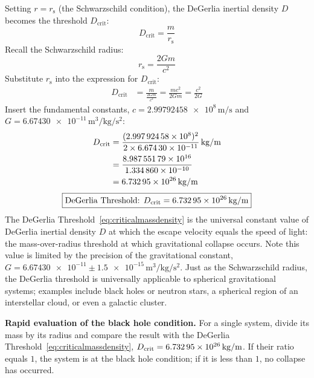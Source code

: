 \documentclass[twoside,twocolumn,9pt,fleqn]{article}
\begin{document}
Setting $r = r_{\mathrm{s}}$ (the Schwarzschild condition), the DeGerlia inertial density $D$ becomes the threshold $D_{\mathrm{crit}}$:
\begin{equation}
D_{\mathrm{crit}} = \frac{m}{r_{\mathrm{s}}}
\label{eq:dcritdef}
\end{equation}
Recall the Schwarzschild radius\cite{schwarzschild1916radius}:
\begin{equation}
r_{\mathrm{s}} = \frac{2Gm}{c^2}
\label{eq:schwarzschildradius}
\end{equation}
Substitute $r_{\mathrm{s}}$ into the expression for $D_{\mathrm{crit}}$:
\begin{align}
D_{\mathrm{crit}} &= \frac{m}{\frac{2Gm}{c^2}} = \frac{m c^2}{2Gm} = \frac{c^2}{2G}
\end{align}
Insert the fundamental constants\cite{crc2019}, $c = \num{2.99792458e8}\,\unit{\meter\per\second}$ and $G = \num{6.67430e-11}\,\unit{\meter\cubed\per\kilogram\per\second\squared}$:
\begin{align*}
D_{\mathrm{crit}} &= \frac{(\num{2.99792458e8})^2}{2 \times \num{6.67430e-11}}\,\unit[per-mode=symbol]{\kilogram\per\meter} \\
         &= \frac{\num{8.98755179e16}}{\num{1.334860e-10}} \\
         &= \num{6.73295e26}\,\unit[per-mode=symbol]{\kilogram\per\meter}
\end{align*}
\begin{equation}
\boxed{ \text{DeGerlia Threshold: } D_{\mathrm{crit}} = \num{6.73295e26}\,\unit[per-mode=symbol]{\kilogram\per\meter} }
\label{eq:criticalmassdensity}
\end{equation}
The DeGerlia Threshold~\eqref{eq:criticalmassdensity} is the universal constant value of DeGerlia inertial density $D$ at which the escape velocity equals the speed of light: the mass-over-radius threshold at which gravitational collapse occurs. Note this value is limited by the precision of the gravitational constant\cite{codata2018}, $G = \num{6.67430e-11} \pm \num{1.5e-15}\,\unit{\meter\cubed\per\kilogram\per\second\squared}$. Just as the Schwarzschild radius, the DeGerlia threshold is universally applicable to spherical gravitational systems; examples include black holes or neutron stars, a spherical region of an interstellar cloud, or even a galactic cluster.

\begin{mdframed}
\noindent\textbf{Rapid evaluation of the black hole condition.} For a single system, divide its mass by its radius and compare the result with the DeGerlia Threshold~\eqref{eq:criticalmassdensity}, $D_{\mathrm{crit}} = \num{6.73295e26}\,\unit[per-mode=symbol]{\kilogram\per\meter}$. If their ratio equals $1$, the system is at the black hole condition; if it is less than $1$, no collapse has occurred.
\end{mdframed}
\end{document}
